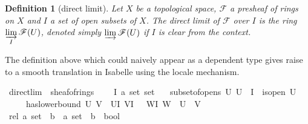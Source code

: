 \documentclass[12pt]{scrartcl}
\newtheorem{definition}[proposition]{Definition}
\begin{document}
\begin{definition}[direct limit]
	Let $X$ be a topological space, $\mathscr{F}$ a presheaf of rings on $X$ and $I$ a set of open subsets of $X$. The direct limit of $\mathscr{F}$ over $I$ is the ring $\displaystyle \varinjlim_I \mathscr{F}(U)$, denoted simply $\varinjlim \mathscr{F}(U)$ if $I$ is clear from the context.
\end{definition}

The definition above which could naively appear as a dependent type gives raise to a smooth translation in Isabelle using the locale mechanism.


\begin{isabelle}
\isamarkupfalse%
\ direct{\isacharunderscore}{\kern0pt}lim\ {\isacharequal}{\kern0pt}\ sheaf{\isacharunderscore}{\kern0pt}of{\isacharunderscore}{\kern0pt}rings\ {\isacharplus}{\kern0pt}\isanewline
\ \ \ I{\isacharcolon}{\kern0pt}{\isacharcolon}{\kern0pt}\ {\isachardoublequoteopen}{\isacharprime}{\kern0pt}a\ set\ set{\isachardoublequoteclose}\isanewline
\ \ \ subset{\isacharunderscore}{\kern0pt}of{\isacharunderscore}{\kern0pt}opens{\isacharcolon}{\kern0pt}\ {\isachardoublequoteopen}{\isasymAnd}U{\isachardot}{\kern0pt}\ U\ {\isasymin}\ I\ {\isasymLongrightarrow}\ is{\isacharunderscore}{\kern0pt}open\ U{\isachardoublequoteclose}\isanewline
\ \ \ \ \ has{\isacharunderscore}{\kern0pt}lower{\isacharunderscore}{\kern0pt}bound{\isacharcolon}{\kern0pt}\ {\isachardoublequoteopen}{\isasymAnd}U\ V{\isachardot}{\kern0pt}\ {\isasymlbrakk}\ U{\isasymin}I{\isacharsemicolon}{\kern0pt}\ V{\isasymin}I\ {\isasymrbrakk}\ {\isasymLongrightarrow}\ {\isasymexists}W{\isasymin}I{\isachardot}{\kern0pt}\ W\ {\isasymsubseteq}\ U\ {\isasyminter}\ V{\isachardoublequoteclose}\isanewline
{}\isanewline
\isanewline
{}\isamarkupfalse%
\ rel{\isacharcolon}{\kern0pt}{\isacharcolon}{\kern0pt}\ {\isachardoublequoteopen}{\isacharparenleft}{\kern0pt}{\isacharprime}{\kern0pt}a\ set\ {\isasymtimes}\ {\isacharprime}{\kern0pt}b{\isacharparenright}{\kern0pt}\ {\isasymRightarrow}\ {\isacharparenleft}{\kern0pt}{\isacharprime}{\kern0pt}a\ set\ {\isasymtimes}\ {\isacharprime}{\kern0pt}b{\isacharparenright}{\kern0pt}\ {\isasymRightarrow}\ bool{\isachardoublequoteclose}\ {\isacharparenleft}{\kern0pt}\ {\isachardoublequoteopen}{\isasymsim}{\isachardoublequoteclose}\ {}{}{\isacharparenright}{\kern0pt}\isanewline

\end{isabelle}
\end{document}
